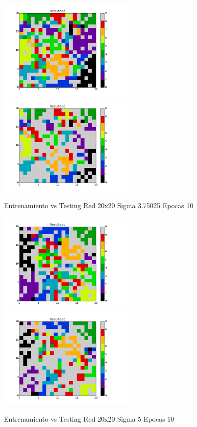 \includegraphics[width=0.5\textwidth]{img/EJ2_Sigma/train_M_20_sigma_3_75025_epocas_5}
\includegraphics[width=0.5\textwidth]{img/EJ2_Sigma/test_M_20_sigma_3_75025_epocas_5}
{\center \footnotesize Entrenamiento vs Testing Red 20x20 Sigma 3.75025 Epocas 10\par}

\includegraphics[width=0.5\textwidth]{img/EJ2_Sigma/train_M_20_sigma_5_0_epocas_5}
\includegraphics[width=0.5\textwidth]{img/EJ2_Sigma/test_M_20_sigma_5_0_epocas_5}
{\center \footnotesize Entrenamiento vs Testing Red 20x20 Sigma 5 Epocas 10\par}

